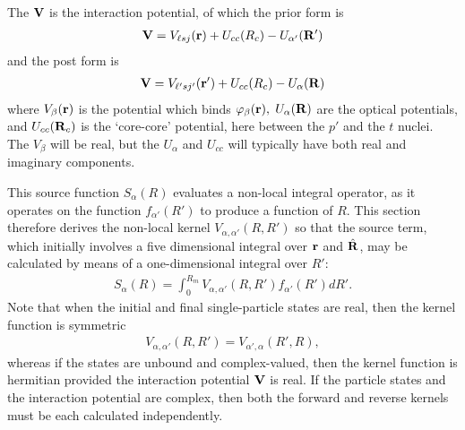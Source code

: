 \documentclass[11pt,a4paper]{article}
\newcommand{\vecr}{{\bf r}}
\newcommand{\vecR}{{\bf R}}
\begin{document}
The ${\bf V}$ is the interaction potential, of which the prior form is
\begin{eqnarray}
  {\bf V} = V_{\ell sj} (\vecr) + U_{cc} (R_c) - U_{\alpha'} (\vecR')
\end{eqnarray}
and the post form is
\begin{eqnarray}
 {\bf V} = V_{\ell' sj'} (\vecr') + U_{cc} (R_c) - U _\alpha (\vecR)
\end{eqnarray}
where $ V_\beta (\vecr)$ is the potential which binds
$ \varphi_\beta (\vecr),$ $U _\alpha (\vecR)$
are the optical potentials, and $U_{cc} (\vecR_c)$
is the `core-core' potential, here between the $p'$
and the $t$ nuclei.
The $ V_\beta$ will be real, but the $U _\alpha$ and
$U_{cc}$ will typically have both real and imaginary components.

This source function $S_\alpha (R)$ evaluates a non-local
integral operator, as it operates on the function
$f_{\alpha'} (R' ) $ to produce a function of $R$.
This section therefore derives the non-local kernel
$V_{\alpha ,\alpha'} (R,R' ) $
so that the source term, which initially involves a five
dimensional integral over $ \vecr $ and $ \hat \vecR$,
may be calculated by means
of a one-dimensional integral over $R'$:
\begin{eqnarray} \label{sourceint}
S_\alpha (R) = \int_ 0 ^ {R_m}
                  V_{\alpha ,\alpha'} (R,R' )
                  f_{\alpha'} (R' ) dR' .
\end{eqnarray}
Note that when the initial and final single-particle states are real, then
the kernel function is symmetric
\begin{eqnarray}
  V_{\alpha ,\alpha'} (R,R' ) =
  V_{\alpha' ,\alpha} (R' ,R),
\end{eqnarray}
whereas if the states are unbound and complex-valued, then the kernel
function is hermitian provided the interaction potential
${\bf V}$ is real. If the particle states and the interaction potential
are complex, then both the forward and reverse kernels must be
each calculated independently.
\end{document}
